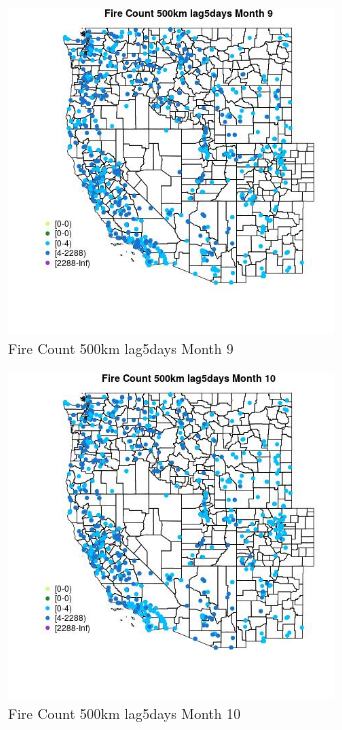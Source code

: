 \begin{figure} 
\centering  
\includegraphics[width=0.77\textwidth]{Code_Outputs/Report_ML_input_PM25_Step4_part_e_de_duplicated_aves_compiled_2019-05-21wNAs_MapObsMo9Fire_Count_500km_lag5days.jpg} 
\caption{\label{fig:Report_ML_input_PM25_Step4_part_e_de_duplicated_aves_compiled_2019-05-21wNAsMapObsMo9Fire_Count_500km_lag5days}Fire Count 500km lag5days Month 9} 
\end{figure} 
 

\begin{figure} 
\centering  
\includegraphics[width=0.77\textwidth]{Code_Outputs/Report_ML_input_PM25_Step4_part_e_de_duplicated_aves_compiled_2019-05-21wNAs_MapObsMo10Fire_Count_500km_lag5days.jpg} 
\caption{\label{fig:Report_ML_input_PM25_Step4_part_e_de_duplicated_aves_compiled_2019-05-21wNAsMapObsMo10Fire_Count_500km_lag5days}Fire Count 500km lag5days Month 10} 
\end{figure} 
 

